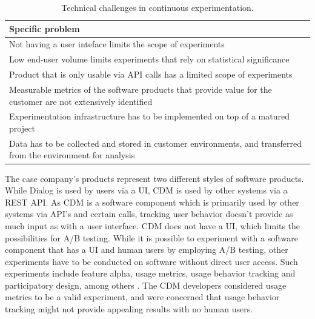 \documentclass[english]{tktltiki2}
\theoremstyle{definition}
\theoremstyle{remark}
\begin{document}
\begin{center}
\begin{table}[htb]
    \begin{tabular}{ | p{12cm} |}
    \hline
    \textbf{Specific problem} \\ \hline
    Not having a user inteface limits the scope of experiments \\ \hline
    Low end-user volume limits experiments that rely on statistical significance \\ \hline 
	Product that is only usable via API calls has a limited scope of experiments \\ \hline
	Measurable metrics of the software products that provide value for the customer are not extensively identified  \\ \hline
	Experimentation infrastructure has to be implemented on top of a matured project \\ \hline
	Data has to be collected and stored in customer environments, and transferred from the environment for analysis \\ 
    \hline
    \end{tabular}
    \caption{Technical challenges in continuous experimentation.}
    \end{table}
\end{center}
The case company's products represent two different styles of software products. While Dialog is used by users via a UI, CDM is used by other systems via a REST API. As CDM is a software component which is primarily used by other systems via API's and certain calls, tracking user behavior doesn't provide as much input as with a user interface. CDM does not have a UI, which limits the possibilities for A/B testing. While it is possible to experiment with a software component that has a UI and human users by employing A/B testing, other experiments have to be conducted on software without direct user access. Such experiments include feature alpha, usage metrics, usage behavior tracking and participatory design, among others \cite{bosch2012building}. The CDM developers considered usage metrics to be a valid experiment, and were concerned that usage behavior tracking might not provide appealing results with no human users.
\end{document}
